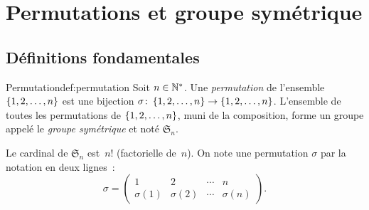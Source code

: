 \begin{center}
\label{fig:parallelogramme-det}
\end{center}

\section{Permutations et groupe symétrique}\label{sec:permutations}

\subsection{Définitions fondamentales}\label{subsec:perm-def}

\begin{definition}{Permutation}{def:permutation}
  Soit $n\in{\mathbb{N}}^*$. Une \emph{permutation} de
  l'ensemble $\left\{1,2,\ldots,n\right\}$ est une bijection
  $\sigma\colon\left\{1,2,\ldots,n\right\}\to\left\{1,2,\ldots,n\right\}$.
  L'ensemble de toutes les permutations de $\left\{1,2,\ldots,n\right\}$,
  muni de la composition, forme un groupe appelé le \emph{groupe
  symétrique} et noté $\mathfrak{S}_n$.
\end{definition}

Le cardinal de $\mathfrak{S}_n$ est~$n!$ (factorielle de~$n$). On note
une permutation $\sigma$ par la notation en deux lignes~:
\[
  \sigma=\begin{pmatrix}1&2&\cdots&n\\
  \sigma(1)&\sigma(2)&\cdots&\sigma(n)\end{pmatrix}.
\]

